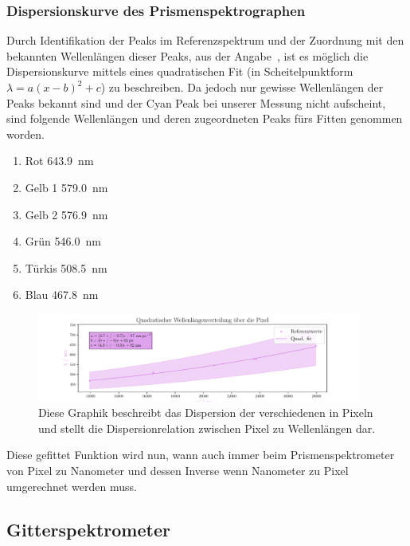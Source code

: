 \documentclass[12pt,english,ngerman]{scrartcl}
\begin{document}
\subsubsection{Dispersionskurve des Prismenspektrographen}\label{sec:DispersionPrism}

Durch Identifikation der Peaks im Referenzspektrum und der Zuordnung mit den
bekannten Wellenlängen dieser Peaks, aus der Angabe~\cite{}, ist es möglich die
Dispersionskurve mittels eines quadratischen Fit (in Scheitelpunktform $\lambda
	= a (x-b)^2 + c$) zu beschreiben. Da jedoch nur gewisse Wellenlängen der Peaks
bekannt sind und der Cyan Peak bei unserer Messung nicht aufscheint, sind
folgende Wellenlängen und deren zugeordneten Peaks fürs Fitten genommen worden.

\begin{enumerate}
	\item Rot \SI{643.9}{\nano\meter}
	\item Gelb 1 \SI{579.0}{\nano\meter}
	\item Gelb 2 \SI{576.9}{\nano\meter}
	\item Grün \SI{546.0}{\nano\meter}
	\item Türkis \SI{508.5}{\nano\meter}
	\item Blau \SI{467.8}{\nano\meter}
\end{enumerate}

\begin{figure}[H]
	\begin{center}
		\includegraphics[width=0.95\textwidth]{figures/mappingPxToWaveLength.pdf}
	\end{center}
	\caption{Diese Graphik beschreibt das Dispersion der verschiedenen in Pixeln
		und stellt die Dispersionrelation zwischen Pixel zu Wellenlängen dar.
	}\label{fig:dispersionkurve}
\end{figure}

Diese gefittet Funktion wird nun, wann auch immer beim Prismenspektrometer von
Pixel zu Nanometer und dessen Inverse wenn Nanometer zu Pixel umgerechnet
werden muss.

\subsection{Gitterspektrometer}
\end{document}

